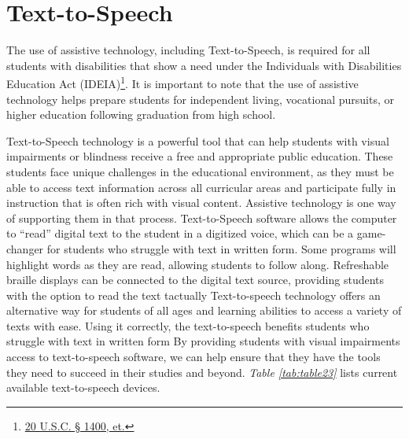 \pagebreak \hypertarget{text-to-speech}{}\section{Text-to-Speech}\label{text-to-speech}
The use of assistive technology, including Text-to-Speech, is required for all students with disabilities that show a need under the Individuals with Disabilities Education Act (IDEIA)\footnote{\raggedright \href{http://sites.ed.gov/idea/statuteregulations/}{20 U.S.C. § 1400, et.}}. It is important to note that the use of assistive technology helps prepare students for independent living, vocational pursuits, or higher education following graduation from high school. 

Text-to-Speech technology is a powerful tool that can help students with visual impairments or blindness receive a free and appropriate public education. These students face unique challenges in the educational environment, as they must be able to access text information across all curricular areas and participate fully in instruction that is often rich with visual content. Assistive technology is one way of supporting them in that process. Text-to-Speech software allows the computer to “read” digital text to the student in a digitized voice, which can be a game-changer for students who struggle with text in written form. Some programs will highlight words as they are read, allowing students to follow along. Refreshable braille displays can be connected to the digital text source, providing students with the option to read the text tactually Text-to-speech technology offers an alternative way for students of all ages and learning abilities to access a variety of texts with ease. Using it correctly, the text-to-speech benefits students who struggle with text in written form By providing students with visual impairments access to text-to-speech software, we can help ensure that they have the tools they need to succeed in their studies and beyond. \textit{Table \ref{tab:table23}} lists current available text-to-speech devices.

